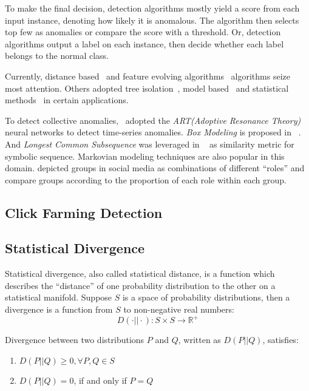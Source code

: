 \documentclass[a4paper]{IEEEtran}
\begin{document}
			To make the final decision, detection algorithms mostly yield a score from each input instance, denoting how likely it is anomalous. The algorithm then selects top few as anomalies or compare the score with a threshold. Or, detection algorithms output a label on each instance, then decide whether each label belongs to the normal class.
			
			Currently, distance based~\cite{cao2014scalable,cao2017multi} and feature evolving algorithms~\cite{masud2013classification,li2015discovery,shao2014prototype} algorithms seize most attention. Others adopted tree isolation~\cite{zhang2017lshiforest}, model based~\cite{yin2016model} and statistical methods~\cite{zhu2002statstream} in certain applications.
			
			To detect collective anomalies,~\cite{caudell1993adaptive} adopted the \textit{ART(Adoptive Resonance Theory)} neural networks to detect time-series anomalies. \textit{Box Modeling} is proposed in ~\cite{chan2005modeling}. And \textit{Longest Common Subsequence} was leveraged in ~\cite{budalakoti2006anomaly} as similarity metric for symbolic sequence. Markovian modeling techniques are also popular in this domain\cite{ye2000markov,warrender1999detecting,pavlov2003sequence}. \cite{yu2015glad} depicted groups in social media as combinations of different ``roles'' and compare groups according to the proportion of each role within each group.
		
		\subsection{Click Farming Detection}
		
		\subsection{Statistical Divergence}
			Statistical divergence, also called statistical distance, is a function which describes the ``distance'' of one probability distribution to the other on a statistical manifold. Suppose $S$ is a space of probability distributions, then a divergence is a function from $S$ to non-negative real numbers: 
			\begin{equation}
				D(\cdot || \cdot): S \times S \rightarrow \mathbb{R^+}
			\end{equation}
			
			Divergence between two distributions $P$ and $Q$, written as $D(P||Q)$, satisfies:
			
			\begin{enumerate}
				\item $D(P||Q) \ge 0, \forall P, Q \in S$
				\item $D(P||Q) = 0$, if and only if $P=Q$
			\end{enumerate}
			
\end{document}
